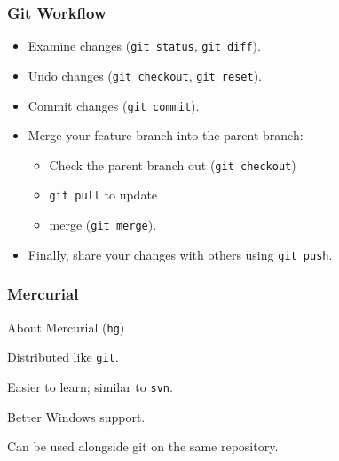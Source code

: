 \begin{frame}
\frametitle{Git Workflow}
\begin{changemargin}{1cm}
\begin{itemize}
\item Examine changes ({\tt git status}, {\tt git diff}).
\item Undo changes ({\tt git checkout}, {\tt git reset}).
\item Commit changes ({\tt git commit}).
\item Merge your feature branch into the parent branch:
 \begin{itemize}
 \item Check the parent branch out ({\tt git checkout})
 \item {\tt git pull} to update
 \item merge ({\tt git merge}).
 \end{itemize}
\item Finally, share your changes with others using {\tt git push}.
\end{itemize}

\end{changemargin}
\end{frame}

\begin{frame}
\frametitle{Mercurial}
\begin{changemargin}{1cm}
About Mercurial (\texttt{hg})

Distributed like \texttt{git}.

Easier to learn; similar to \texttt{svn}.

Better Windows support.

Can be used alongside git on the same repository.

\end{changemargin}
\end{frame}


